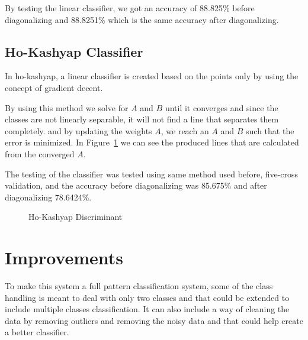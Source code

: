 \documentclass[11pt, oneside]{article}   	%
\begin{document}
By testing the linear classifier, we got an accuracy of 88.825\% before diagonalizing and 88.8251\% which is the same accuracy after diagonalizing.

\subsection{Ho-Kashyap Classifier}
In ho-kashyap, a linear classifier is created based on the points only by using the concept of gradient decent.

By using this method we solve for $A$ and $B$ until it converges and since the classes are not linearly separable, it will not find a line that separates them completely. and by updating the weights $A$, we reach an $A$ and $B$ such that the error is minimized. In Figure~\ref{fig:hk-disc} we can see the produced lines that are calculated from the converged $A$.

The testing of the classifier was tested using same method used before, five-cross validation, and the accuracy before diagonalizing was 85.675\% and after diagonalizing 78.6424\%.

\begin{figure}
\begin{center}
\end{center}
\caption{Ho-Kashyap Discriminant}
\label{fig:hk-disc}
\end{figure}

\section*{Improvements}
To make this system a full pattern classification system, some of the class handling is meant to deal with only two classes and that could be extended to include multiple classes classification. It can also include a way of cleaning the data by removing outliers and removing the noisy data and that could help create a better classifier.  
\end{document}
